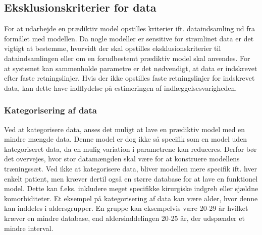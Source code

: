 

%


\subsection{Eksklusionskriterier for data} 
For at udarbejde en prædiktiv model opstilles kriterier ift. dataindsamling ud fra formålet med modellen. Da nogle modeller er sensitive for strømlinet data er det vigtigt at bestemme, hvorvidt der skal opstilles eksklusionskriterier til dataindsamlingen eller om en forudbestemt prædiktiv model skal anvendes.\cite{Kuhn2013}
For at systemet kan sammenholde parametre er det nødvendigt, at data er indskrevet efter faste retningslinjer. Hvis der ikke opstilles faste retningslinjer for indskrevet data, kan dette have indflydelse på estimeringen af indlæggelsesvarigheden.\cite{Kuhn2013} 

\subsubsection{Kategorisering af data}
Ved at kategorisere data, anses det muligt at lave en prædiktiv model med en mindre mængde data. Denne model er dog ikke så specifik som en model uden kategoriseret data, da en mulig variation i parametrene kan reduceres.\cite{Rowan2007} 
Derfor bør det overvejes, hvor stor datamængden skal være for at konstruere modellens træningssæt. Ved ikke at kategorisere data, bliver modellen mere specifik ift. hver enkelt patient, men kræver dertil også en større database for at lave en funktionel model. Dette kan f.eks. inkludere meget specifikke kirurgiske indgreb eller sjældne komorbiditeter. 
Et eksempel på kategorisering af data kan være alder, hvor denne kan inddeles i aldersgrupper. En gruppe kan eksempelvis være 20-29 år hvilket kræver en mindre database, end aldersinddelingen 20-25 år, der udspænder et mindre interval.\cite{Rowan2007}  

